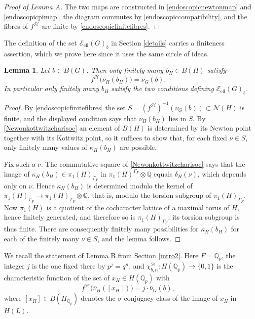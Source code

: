 \documentclass[11pt,a4paper]{article}
\newcommand{\Eell}{\mathcal{E}_{\mathrm{ell}}}
\theoremstyle{definition}
\theoremstyle{plain}
\newtheorem{Le}[shared]{Lemma}
\theoremstyle{remark}
\theoremstyle{plain}
\begin{document}
\begin{proof}[Proof of Lemma A]
    The two maps are constructed in \ref{endoscopicnewtonmap} and \ref{endoscopicpimap}, the diagram commutes by \ref{endoscopiccompatibility}, and the fibres of $f^{\mathcal H}$ are finite by \ref{endoscopicfinitefibres}.
\end{proof}

The definition of the set $\Eell(G)_b$ in Section \ref{details} carries a finiteness assertion, which we prove here since it uses the same circle of ideas.

\begin{Le}\label{finitelymanybH}
    Let $b \in B(G)$. Then only finitely many $b_H \in B(H)$ satisfy
    $$f^{\mathcal H}\bigl(\overline{\nu}_H(b_H)\bigr) = \overline{\nu}_G(b).$$
    In particular only finitely many $b_H$ satisfy the two conditions defining $\Eell(G)_b$.
\end{Le}
\begin{proof}
    By \ref{endoscopicfinitefibres} the set $S = (f^{\mathcal H})^{-1}(\overline{\nu}_G(b)) \subset \mathcal{N}(H)$ is finite, and the displayed condition says that $\overline{\nu}_H(b_H)$ lies in $S$. By \ref{Newonkottwitzcharisoc} an element of $B(H)$ is determined by its Newton point together with its Kottwitz point, so it suffices to show that, for each fixed $\nu \in S$, only finitely many values of $\kappa_H(b_H)$ are possible.

    Fix such a $\nu$. The commutative square of \ref{Newonkottwitzcharisoc} says that the image of $\kappa_H(b_H) \in \pi_1(H)_{\Gamma_F}$ in $\pi_1(H)^{\Gamma_F} \otimes \mathbb{Q}$ equals $\delta_H(\nu)$, which depends only on $\nu$. Hence $\kappa_H(b_H)$ is determined modulo the kernel of $\pi_1(H)_{\Gamma_F} \xrightarrow[]{} \pi_1(H)_{\Gamma_F} \otimes \mathbb{Q}$, that is, modulo the torsion subgroup of $\pi_1(H)_{\Gamma_F}$. Now $\pi_1(H)$ is a quotient of the cocharacter lattice of a maximal torus of $H$, hence finitely generated, and therefore so is $\pi_1(H)_{\Gamma_F}$; its torsion subgroup is thus finite. There are consequently finitely many possibilities for $\kappa_H(b_H)$ for each of the finitely many $\nu \in S$, and the lemma follows.
\end{proof}

We recall the statement of Lemma B from Section \ref{intro2}. Here $F = \mathbb{Q}_p$, the integer $j$ is the one fixed there by $p^j = q^n$, and $\chi_{b,n}^{\mathcal H}: H(\mathbb{Q}_p) \xrightarrow[]{} \{0,1\}$ is the characteristic function of the set of $x_H \in H(\mathbb{Q}_p)$ with
$$
f^{\mathcal H}\bigl(\overline{\nu}_H([x_H])\bigr)=j\cdot\overline{\nu}_G(b),
$$
where $[x_H]\in B(H_{\mathbb Q_p})$ denotes the $\sigma$-conjugacy class of the image of $x_H$ in $H(L)$.
\end{document}
